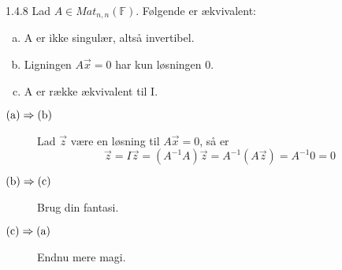 
\begin{saetning}{1.4.8}
	Lad $A \in Mat_{n,n}(\mathbb{F})$. Følgende er ækvivalent:
	\begin{enumerate}[(a)]
		\item A er ikke singulær, altså invertibel.
		\item Ligningen $A \vec{x} =0$ har kun løsningen $0$.
		\item A er række ækvivalent til I.
	\end{enumerate}
\end{saetning}

\begin{bevis}
	\begin{description}
		\item[$\textmd{(a)} \Rightarrow \textmd{(b)}$]
			Lad $\vec{z}$ være en løsning til $A \vec{x}=0$, så er
			\[
				\vec{z} = I \vec{z} = (A^{-1}A)\vec{z} = A^{-1}(A\vec{z})
				= A^{-1}0 = 0
			\]
		\item[$\textmd{(b)} \Rightarrow \textmd{(c)}$] Brug din fantasi.
		\item[$\textmd{(c)} \Rightarrow \textmd{(a)}$] Endnu mere magi.
	\end{description}
\end{bevis}

